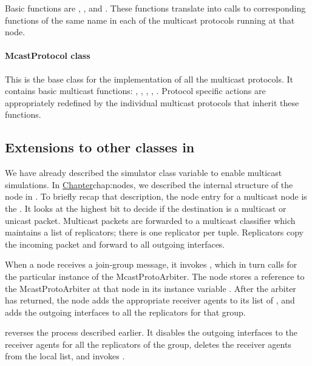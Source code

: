 Basic functions are , , and
.
These functions translate into calls to corresponding functions of the
same name in each of the multicast protocols running at that node.

\paragraph{McastProtocol class}
This is the base class for the implementation of all the multicast protocols.
It contains basic multicast functions:
, ,
, , .
Protocol specific actions are appropriately redefined
by the individual multicast protocols that inherit these functions.

\subsection{Extensions to other classes in \ns}
We have already described the simulator class variable
 to enable multicast simulations.
In 
\href{the earlier chapter describing nodes in \ns}{Chapter}{chap:nodes},
we described the internal structure of the node in \ns.
To briefly recap that description, the node entry for a multicast node is
the .  It looks at the highest bit to decide
 if the destination is a multicast or unicast packet.
 Multicast packets are forwarded to a multicast
classifier which maintains a list of replicators;
there is one replicator per  tuple.
Replicators copy the incoming packet and forward to all outgoing interfaces.

When a node receives a join-group message,
it invokes , 
which in turn calls
 for the particular instance
of the McastProtoArbiter.
The node stores a reference to the McastProtoArbiter at that node in
its instance variable .
After the arbiter has returned, the node
adds the appropriate receiver agents to its list of ,
and adds the outgoing interfaces to all the replicators for that group.

 reverses the process described earlier.
It disables the outgoing interfaces to the receiver agents
for all the replicators of the group,
deletes the receiver agents from the local  list,
and invokes .

